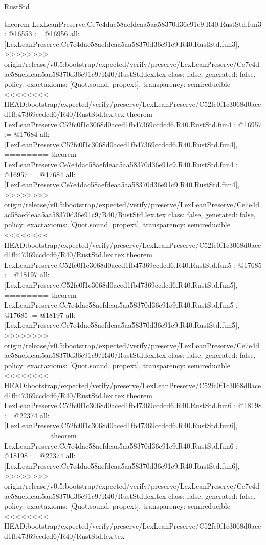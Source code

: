 \begin{lexlean}{RustStd}
\begin{coremodule}
{\begin{coremodule}
{{{{{{theorem LexLeanPreserve.Ce7e4dac58aefdeaa5aa58370d36e91c9.R40.RustStd.fun3 : @16553 := @16956 {
  all: [LexLeanPreserve.Ce7e4dac58aefdeaa5aa58370d36e91c9.R40.RustStd.fun3],
>>>>>>>> origin/release/v0.5:bootstrap/expected/verify/preserve/LexLeanPreserve/Ce7e4dac58aefdeaa5aa58370d36e91c9/R40/RustStd.lex.tex
  class: false,
  generated: false,
  policy: exact{axioms: [Quot.sound, propext]},
  transparency: semireducible
}
<<<<<<<< HEAD:bootstrap/expected/verify/preserve/LexLeanPreserve/C52fc0f1c3068d0aced1fb47369ccdcd6/R40/RustStd.lex.tex
theorem LexLeanPreserve.C52fc0f1c3068d0aced1fb47369ccdcd6.R40.RustStd.fun4 : @16957 := @17684 {
  all: [LexLeanPreserve.C52fc0f1c3068d0aced1fb47369ccdcd6.R40.RustStd.fun4],
========
theorem LexLeanPreserve.Ce7e4dac58aefdeaa5aa58370d36e91c9.R40.RustStd.fun4 : @16957 := @17684 {
  all: [LexLeanPreserve.Ce7e4dac58aefdeaa5aa58370d36e91c9.R40.RustStd.fun4],
>>>>>>>> origin/release/v0.5:bootstrap/expected/verify/preserve/LexLeanPreserve/Ce7e4dac58aefdeaa5aa58370d36e91c9/R40/RustStd.lex.tex
  class: false,
  generated: false,
  policy: exact{axioms: [Quot.sound, propext]},
  transparency: semireducible
}
<<<<<<<< HEAD:bootstrap/expected/verify/preserve/LexLeanPreserve/C52fc0f1c3068d0aced1fb47369ccdcd6/R40/RustStd.lex.tex
theorem LexLeanPreserve.C52fc0f1c3068d0aced1fb47369ccdcd6.R40.RustStd.fun5 : @17685 := @18197 {
  all: [LexLeanPreserve.C52fc0f1c3068d0aced1fb47369ccdcd6.R40.RustStd.fun5],
========
theorem LexLeanPreserve.Ce7e4dac58aefdeaa5aa58370d36e91c9.R40.RustStd.fun5 : @17685 := @18197 {
  all: [LexLeanPreserve.Ce7e4dac58aefdeaa5aa58370d36e91c9.R40.RustStd.fun5],
>>>>>>>> origin/release/v0.5:bootstrap/expected/verify/preserve/LexLeanPreserve/Ce7e4dac58aefdeaa5aa58370d36e91c9/R40/RustStd.lex.tex
  class: false,
  generated: false,
  policy: exact{axioms: [Quot.sound, propext]},
  transparency: semireducible
}
<<<<<<<< HEAD:bootstrap/expected/verify/preserve/LexLeanPreserve/C52fc0f1c3068d0aced1fb47369ccdcd6/R40/RustStd.lex.tex
theorem LexLeanPreserve.C52fc0f1c3068d0aced1fb47369ccdcd6.R40.RustStd.fun6 : @18198 := @22374 {
  all: [LexLeanPreserve.C52fc0f1c3068d0aced1fb47369ccdcd6.R40.RustStd.fun6],
========
theorem LexLeanPreserve.Ce7e4dac58aefdeaa5aa58370d36e91c9.R40.RustStd.fun6 : @18198 := @22374 {
  all: [LexLeanPreserve.Ce7e4dac58aefdeaa5aa58370d36e91c9.R40.RustStd.fun6],
>>>>>>>> origin/release/v0.5:bootstrap/expected/verify/preserve/LexLeanPreserve/Ce7e4dac58aefdeaa5aa58370d36e91c9/R40/RustStd.lex.tex
  class: false,
  generated: false,
  policy: exact{axioms: [Quot.sound, propext]},
  transparency: semireducible
}
<<<<<<<< HEAD:bootstrap/expected/verify/preserve/LexLeanPreserve/C52fc0f1c3068d0aced1fb47369ccdcd6/R40/RustStd.lex.tex
}}}}}}}}}
\end{coremodule}}
\end{coremodule}
\end{lexlean}
